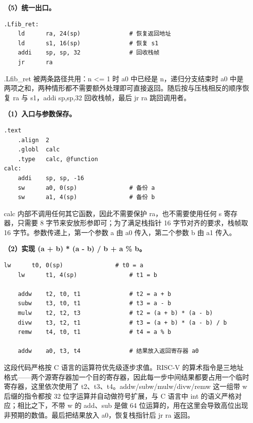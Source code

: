 \documentclass[UTF8,a4paper,10pt]{ctexart}
\newcommand{\hfour}[1]{\par\vspace{0.55em}\noindent{\bfseries #1}\par\vspace{0.25em}}
\begin{document}
\textbf{（5）统一出口。}

\begin{lstlisting}[language=riscv]
.Lfib_ret:
    ld      ra, 24(sp)              # 恢复返回地址
    ld      s1, 16(sp)              # 恢复 s1
    addi    sp, sp, 32              # 回收栈帧
    jr      ra
\end{lstlisting}

.Lfib\_ret 被两条路径共用：n <= 1 时 a0 中已经是 n，递归分支结束时 a0 中是两项之和，两种情形都不需要额外处理即可直接返回。随后按与压栈相反的顺序恢复 ra 与 s1，addi sp,sp,32 回收栈帧，最后 jr ra 跳回调用者。

\hfour{4. 函数 calc}

\textbf{（1）入口与参数保存。}

\begin{lstlisting}[language=riscv]
    .text
    .align  2
    .globl  calc
    .type   calc, @function
calc:
    addi    sp, sp, -16
    sw      a0, 0(sp)               # 备份 a
    sw      a1, 4(sp)               # 备份 b
\end{lstlisting}

calc 内部不调用任何其它函数，因此不需要保护 ra，也不需要使用任何 s 寄存器，只需要 8 字节来安放形参即可；为了满足栈指针 16 字节对齐的要求，栈帧取 16 字节。参数传递上，第一个参数 a 由 a0 传入，第二个参数 b 由 a1 传入。

\textbf{（2）实现 (a + b) * (a - b) / b + a \% b。}

\begin{lstlisting}[language=riscv]
    lw      t0, 0(sp)               # t0 = a
    lw      t1, 4(sp)               # t1 = b

    addw    t2, t0, t1              # t2 = a + b
    subw    t3, t0, t1              # t3 = a - b
    mulw    t2, t2, t3              # t2 = (a + b) * (a - b)
    divw    t3, t2, t1              # t3 = (a + b) * (a - b) / b
    remw    t4, t0, t1              # t4 = a % b

    addw    a0, t3, t4              # 结果放入返回寄存器 a0
\end{lstlisting}

这段代码严格按 C 语言的运算符优先级逐步求值。RISC-V 的算术指令是三地址格式——两个源寄存器加一个目的寄存器，因此每一步中间结果都要占用一个临时寄存器，这里依次使用了 t2、t3、t4。addw/subw/mulw/divw/remw 这一组带 w 后缀的指令都按 32 位字运算并自动做符号扩展，与 C 语言中 int 的语义严格对应；相比之下，不带 w 的 add、sub 是做 64 位运算的，用在这里会导致高位出现非预期的数值。最后把结果放入 a0，恢复栈指针后 jr ra 返回。
\end{document}

